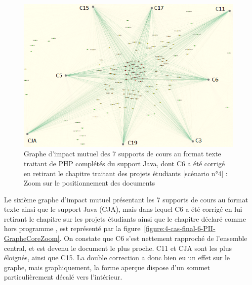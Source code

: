 \begin{figure}[htb!]
\centering
\centerline{  %
\includegraphics[scale=0.75]{4-Experiences/images/cas-final/5-Full-Text-C+noP-PHP+Java_core-courses-written.png}
}
\caption{Graphe d'impact mutuel des 7 supports de cours au format texte traitant de PHP complétés du support Java, dont C6 a été corrigé en retirant le chapitre traitant des projets étudiants [scénario n°4] : Zoom sur le positionnement des documents}
\label{figure:4-cas-final-5-PII-GrapheCoreZoom}
\end{figure}

\hspace{0pt}
\vfill

\clearpage

Le sixième graphe d'impact mutuel présentant les 7 supports de cours au format texte ainsi que le support Java (CJA), mais dans lequel C6 a été corrigé en lui retirant le chapitre sur les projets étudiants ainsi que le chapitre déclaré comme \og hors programme \fg, est représenté par la figure~\ref{figure:4-cas-final-6-PII-GrapheCoreZoom}.
On constate que C6 s'est nettement rapproché de l'ensemble central, et est devenu le document le plus proche.
C11 et CJA sont les plus éloignés, ainsi que C15.
La double correction a donc bien eu un effet sur le graphe, mais graphiquement, la forme aperçue dispose d'un sommet particulièrement décalé vers l'intérieur.

\vfill
\hspace{0pt}

